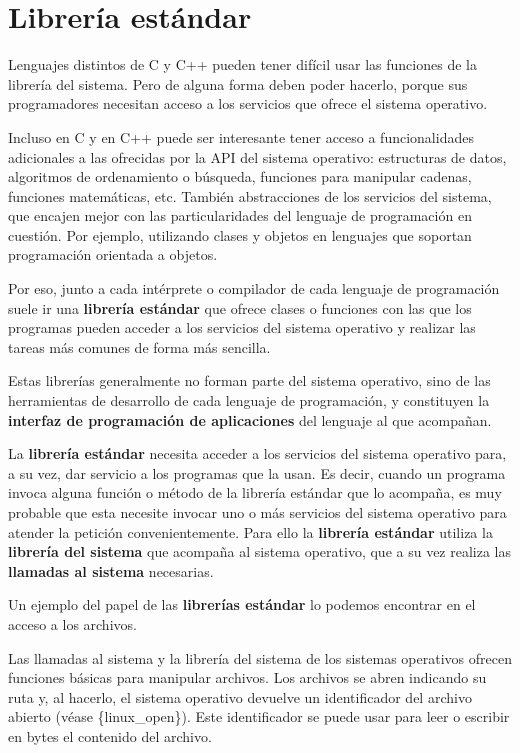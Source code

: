 \section{Librería estándar}\label{_libreruxeda_estuxe1ndar}

{} Lenguajes distintos de C y C++ pueden tener difícil usar las
funciones de la librería del sistema. Pero de alguna forma deben poder
hacerlo, porque sus programadores necesitan acceso a los servicios que
ofrece el sistema operativo.

Incluso en C y en C++ puede ser interesante tener acceso a
funcionalidades adicionales a las ofrecidas por la API del sistema
operativo: estructuras de datos, algoritmos de ordenamiento o búsqueda,
funciones para manipular cadenas, funciones matemáticas, etc. También
abstracciones de los servicios del sistema, que encajen mejor con las
particularidades del lenguaje de programación en cuestión. Por ejemplo,
utilizando clases y objetos en lenguajes que soportan programación
orientada a objetos.

Por eso, junto a cada intérprete o compilador de cada lenguaje de
programación suele ir una \textbf{librería estándar} que ofrece clases o
funciones con las que los programas pueden acceder a los servicios del
sistema operativo y realizar las tareas más comunes de forma más
sencilla.

Estas librerías generalmente no forman parte del sistema operativo, sino
de las herramientas de desarrollo de cada lenguaje de programación, y
constituyen la \textbf{interfaz de programación de aplicaciones} del
lenguaje al que acompañan.

La \textbf{librería estándar} necesita acceder a los servicios del
sistema operativo para, a su vez, dar servicio a los programas que la
usan. Es decir, cuando un programa invoca alguna función o método de la
librería estándar que lo acompaña, es muy probable que esta necesite
invocar uno o más servicios del sistema operativo para atender la
petición convenientemente. Para ello la \textbf{librería estándar}
utiliza la \textbf{librería del sistema} que acompaña al sistema
operativo, que a su vez realiza las \textbf{llamadas al sistema}
necesarias.

Un ejemplo del papel de las \textbf{librerías estándar} lo podemos
encontrar en el acceso a los archivos.

Las llamadas al sistema y la librería del sistema de los sistemas
operativos ofrecen funciones básicas para manipular archivos. Los
archivos se abren indicando su ruta y, al hacerlo, el sistema operativo
devuelve un identificador del archivo abierto (véase \{linux\_open\}).
Este identificador se puede usar para leer o escribir en bytes el
contenido del archivo.

